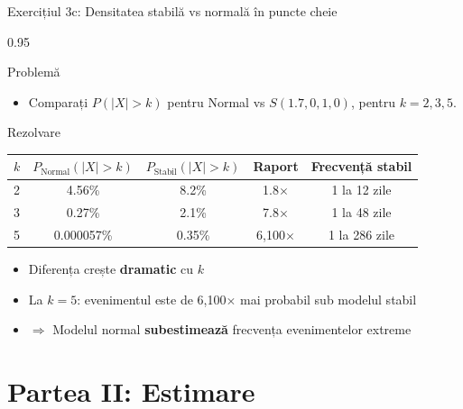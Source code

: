 \documentclass[9pt, aspectratio=169, t]{beamer}
\begin{document}
\begin{frame}{Exercițiul 3c: Densitatea stabilă vs normală în puncte cheie}
    \begin{cminipage}{0.95\textwidth}
\begin{block}{Problemă}
\begin{itemize}\setlength{\itemsep}{0pt}
    \item Comparați $P(|X| > k)$ pentru Normal vs $S(1.7, 0, 1, 0)$, pentru $k = 2, 3, 5$.
\end{itemize}
\end{block}

\begin{exampleblock}{Rezolvare}
\renewcommand{\arraystretch}{1.3}
\begin{center}
\begin{tabular}{lcccc}
\toprule
$k$ & $P_{\text{Normal}}(|X|>k)$ & $P_{\text{Stabil}}(|X|>k)$ & \textbf{Raport} & \textbf{Frecvență stabil} \\
\midrule
2 & 4.56\% & 8.2\% & 1.8$\times$ & 1 la 12 zile \\
3 & 0.27\% & 2.1\% & 7.8$\times$ & 1 la 48 zile \\
5 & 0.000057\% & 0.35\% & 6{,}100$\times$ & 1 la 286 zile \\
\bottomrule
\end{tabular}
\end{center}

\begin{itemize}\setlength{\itemsep}{0pt}
    \item Diferența crește \textbf{dramatic} cu $k$
    \item La $k = 5$: evenimentul este de 6{,}100$\times$ mai probabil sub modelul stabil
    \item $\Rightarrow$ Modelul normal \textbf{subestimează} frecvența evenimentelor extreme
\end{itemize}
\end{exampleblock}
    \end{cminipage}
\end{frame}

\section{Partea II: Estimare}
\end{document}
